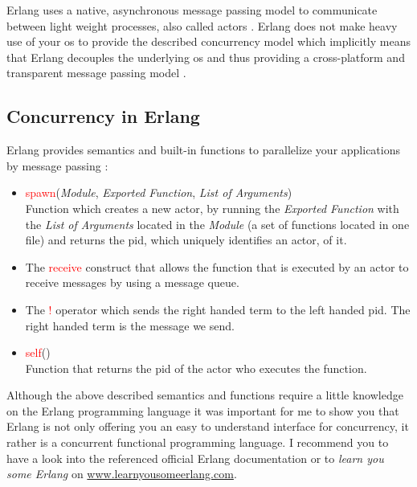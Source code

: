\documentclass[xcolor=dvipsnames]{article}
\begin{document}
\noindent Erlang uses a native, asynchronous message passing model to communicate between light weight processes, also called actors \cite[chap. 1 on p. 1]{Armstrong96erlang}. Erlang does not make heavy use of your \gls{os} to provide the described concurrency model which implicitly means that Erlang decouples the underlying \gls{os} and thus providing a cross-platform and transparent message passing model \cite[chap. 1  \& 3 on p. 1 - 3]{Armstrong96erlang}.

\subsection{Concurrency in Erlang}

\noindent Erlang provides semantics and built-in functions to parallelize your applications by message passing \cite[ch. 4.3 on p. 95 - 104]{erl_doc}:

\begin{itemize}

\item \textcolor{red}{spawn}(\textit{Module}, \textit{Exported Function}, \textit{List of Arguments})\\
Function which creates a new actor, by running the \textit{Exported Function} with the \textit{List of Arguments} located in the \textit{Module} (a set of functions located in one file) and returns the \gls{pid}, which uniquely identifies an actor, of it.\\

\item The \textcolor{red}{receive} construct that allows the function that is executed by an actor to receive messages by using a message queue.

\item The \textcolor{red}{!} operator which sends the right handed term to the left handed \gls{pid}. The right handed term is the message we send.

\item \textcolor{red}{self}() \\
Function that returns the \gls{pid} of the actor who executes the function.

\end{itemize}

\noindent Although the above described semantics and functions require a little knowledge on the Erlang programming language it was important for me to show you that Erlang is not only offering you an easy to understand interface for concurrency, it rather is a concurrent functional programming language. I recommend you to have a look into the referenced official Erlang documentation or to \textit{learn you some Erlang} on \url{www.learnyousomeerlang.com}.
\end{document}
